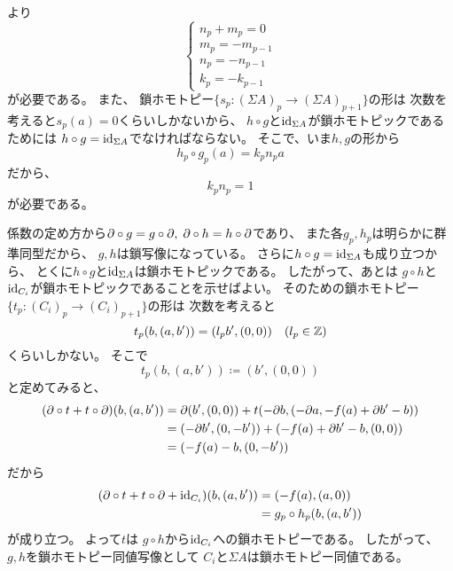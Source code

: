 \documentclass[report]{jlreq}
\begin{document}
\begin{answer}
\begin{innerproof}
        より
        \begin{equation}
            \begin{cases}
                n_p + m_p = 0 \\
                m_p = - m_{p - 1} \\
                n_p = - n_{p - 1} \\
                k_p = - k_{p - 1}
            \end{cases}
        \end{equation}
        が必要である。
        また、
        鎖ホモトピー$\{ s_{p} \colon (\Sigma A)_p \to (\Sigma A)_{p + 1} \}$の形は
        次数を考えると$s_{p}(a) = 0$くらいしかないから、
        $h \circ g$と$\mathrm{id}_{\Sigma A}$が鎖ホモトピックであるためには
        $h \circ g = \mathrm{id}_{\Sigma A}$でなければならない。
        そこで、いま$h, g$の形から
        \begin{equation}
            h_p \circ g_p (a) = k_p n_p a
        \end{equation}
        だから、
        \begin{equation}
            k_p n_p = 1
        \end{equation}
        が必要である。
    \end{innerproof}
    係数の定め方から$\partial \circ g = g \circ \partial, \;
    \partial \circ h = h \circ \partial$であり、
    また各$g_p, h_p$は明らかに群準同型だから、
    $g, h$は鎖写像になっている。
    さらに$h \circ g = \mathrm{id}_{\Sigma A}$も成り立つから、
    とくに$h \circ g$と$\mathrm{id}_{\Sigma A}$は鎖ホモトピックである。
    したがって、あとは
    $g \circ h$と$\mathrm{id}_{C_i}$が鎖ホモトピックであることを示せばよい。
    そのための鎖ホモトピー
    $\{ t_p \colon (C_i)_p \to (C_i)_{p + 1} \}$の形は
    次数を考えると
    \begin{equation}
        t_{p}(b, (a, b')) = (l_p b', (0, 0))
            \quad (l_p \in \mathbb{Z})
    \end{equation}
    くらいしかない。
    そこで
    \begin{equation}
        t_{p}(b, (a, b')) \coloneqq (b', (0, 0))
    \end{equation}
    と定めてみると、
    \begin{alignat}{1}
        (\partial \circ t + t \circ \partial)(b, (a, b'))
            &= \partial (b', (0, 0))
                + t(- \partial b, (- \partial a, - f(a) + \partial b' - b)) \\
            &= (- \partial b', (0, - b'))
                + (- f(a) + \partial b' - b, (0, 0)) \\
            &= (- f(a) - b, (0, - b'))
    \end{alignat}
    だから
    \begin{alignat}{1}
        (\partial \circ t + t \circ \partial + \mathrm{id}_{C_i})(b, (a, b'))
            &= (- f(a), (a, 0)) \\
            &= g_p \circ h_p (b, (a, b'))
    \end{alignat}
    が成り立つ。
    よって$t$は
    $g \circ h$から$\mathrm{id}_{C_i}$への鎖ホモトピーである。
    したがって、
    $g, h$を鎖ホモトピー同値写像として
    $C_i$と$\Sigma A$は鎖ホモトピー同値である。
\end{answer}
\end{document}
